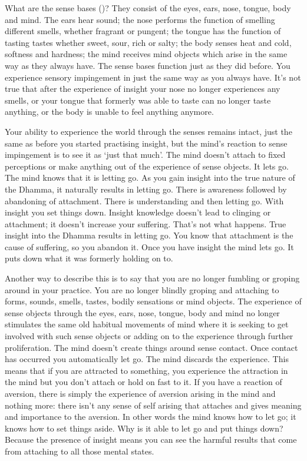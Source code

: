 What are the sense bases ()? They consist of the eyes, ears, nose, tongue, body and mind. The ears hear sound; the nose performs the function of smelling different smells, whether fragrant or pungent; the tongue has the function of tasting tastes whether sweet, sour, rich or salty; the body senses heat and cold, softness and hardness; the mind receives mind objects which arise in the same way as they always have. The sense bases function just as they did before. You experience sensory impingement in just the same way as you always have. It's not true that after the experience of insight your nose no longer experiences any smells, or your tongue that formerly was able to taste can no longer taste anything, or the body is unable to feel anything anymore. 

Your ability to experience the world through the senses remains intact, just the same as before you started practising insight, but the mind's reaction to sense impingement is to see it as `just that much'. The mind doesn't attach to fixed perceptions or make anything out of the experience of sense objects. It lets go. The mind knows that it is letting go. As you gain insight into the true nature of the Dhamma, it naturally results in letting go. There is awareness followed by abandoning of attachment. There is understanding and then letting go. With insight you set things down. Insight knowledge doesn't lead to clinging or attachment; it doesn't increase your suffering. That's not what happens. True insight into the Dhamma results in letting go. You know that attachment is the cause of suffering, so you abandon it. Once you have insight the mind lets go. It puts down what it was formerly holding on to. 

Another way to describe this is to say that you are no longer fumbling or groping around in your practice. You are no longer blindly groping and attaching to forms, sounds, smells, tastes, bodily sensations or mind objects. The experience of sense objects through the eyes, ears, nose, tongue, body and mind no longer stimulates the same old habitual movements of mind where it is seeking to get involved with such sense objects or adding on to the experience through further proliferation. The mind doesn't create things around sense contact. Once contact has occurred you automatically let go. The mind discards the experience. This means that if you are attracted to something, you experience the attraction in the mind but you don't attach or hold on fast to it. If you have a reaction of aversion, there is simply the experience of aversion arising in the mind and nothing more: there isn't any sense of self arising that attaches and gives meaning and importance to the aversion. In other words the mind knows how to let go; it knows how to set things aside. Why is it able to let go and put things down? Because the presence of insight means you can see the harmful results that come from attaching to all those mental states. 

